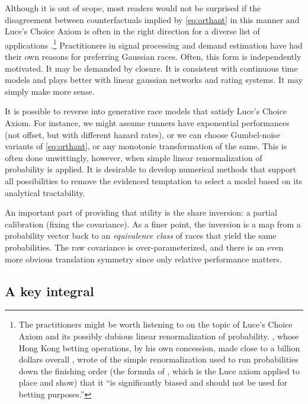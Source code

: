 \documentclass[11pt]{article}
\begin{document}
Although it is out of scope, most readers would not be surprised if the disagreement between counterfactuals implied by \eqref{eq:orthant} in this manner and Luce's Choice Axiom is often in the right direction for a diverse list of applications \citep{cottonsurvey}.\footnote{The practitioners might be worth listening to on the topic of Luce's Choice Axiom and its possibly dubious linear renormalization of probability. \citet{benter1994},
whose Hong Kong betting operations, by his own concession, made close to a
billion dollars overall \citep{chellel2018}, wrote of the simple
renormalization used to run probabilities down the finishing order (the
formula of \citet{harville1973}, which is the Luce axiom applied to place
and show)
that it ``is significantly biased and should not be used for betting
purposes.''} Practitioners in signal processing and demand estimation have had their own reasons for preferring Gaussian races. Often, this form is independently motivated. It may be demanded by closure. It is consistent with continuous time models and plays better with linear gaussian networks and rating systems. It may simply make more sense.

It is possible to reverse into generative race models that satisfy Luce's Choice Axiom. For instance, we might assume runners have exponential performances (not offset, but with different hazard rates), or we can choose Gumbel-noise variants of \eqref{eq:orthant}, or any monotonic transformation of the same. This is often done unwittingly, however, when simple linear renormalization of probability is applied. It is desirable to develop numerical methods that support all possibilities to remove the evidenced temptation to select a model based on its analytical tractability.

An important part of providing that utility is the share inversion: a partial calibration (fixing the covariance). As a finer point, the inversion is a map from a probability vector back to an {\em equivalence class} of races that yield the same probabilities. The raw covariance is over-parameterized, and there is an even more obvious translation symmetry since only relative performance matters.


\subsection{A key integral}
\end{document}
